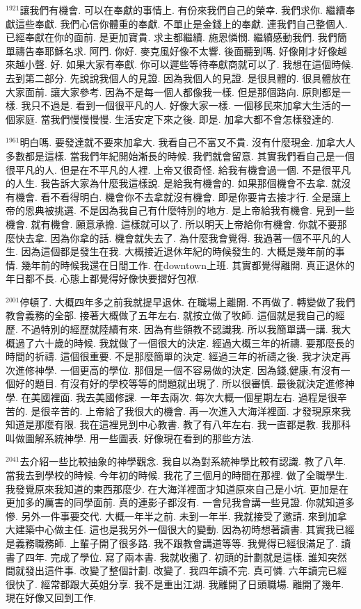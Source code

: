 \documentclass{book}
\begin{document}
$^{1921}$讓我們有機會.
可以在奉獻的事情上.
有份來我們自己的榮幸.
我們求你.
繼續奉獻這些奉獻.
我們心信你體重的奉獻.
不單止是金錢上的奉獻.
連我們自己整個人.
已經奉獻在你的面前.
是更加寶貴.
求主都繼續.
施恩憐憫.
繼續感動我們.
我們簡單禱告奉耶穌名求.
阿門.
你好.
麥克風好像不太響.
後面聽到嗎.
好像剛才好像越來越小聲.
好.
如果大家有奉獻.
你可以遲些等待奉獻商就可以了.
我想在這個時候.
去到第二部分.
先說說我個人的見證.
因為我個人的見證.
是很具體的.
很具體放在大家面前.
讓大家參考.
因為不是每一個人都像我一樣.
但是那個路向.
原則都是一樣.
我只不過是.
看到一個很平凡的人.
好像大家一樣.
一個移民來加拿大生活的一個家庭.
當我們慢慢慢慢.
生活安定下來之後.
即是.
加拿大都不會怎樣發達的.

$^{1961}$明白嗎.
要發達就不要來加拿大.
我看自己不富又不貴.
沒有什麼現金.
加拿大人多數都是這樣.
當我們年紀開始漸長的時候.
我們就會留意.
其實我們看自己是一個很平凡的人.
但是在不平凡的人裡.
上帝又很奇怪.
給我有機會過一個.
不是很平凡的人生.
我告訴大家為什麼我這樣說.
是給我有機會的.
如果那個機會不去拿.
就沒有機會.
看不看得明白.
機會你不去拿就沒有機會.
即是你要肯去接才行.
全是讓上帝的恩典被挑選.
不是因為我自己有什麼特別的地方.
是上帝給我有機會.
見到一些機會.
就有機會.
願意承擔.
這樣就可以了.
所以明天上帝給你有機會.
你就不要那麼快去拿.
因為你拿的話.
機會就失去了.
為什麼我會覺得.
我過著一個不平凡的人生.
因為這個都是發生在我.
大概接近退休年紀的時候發生的.
大概是幾年前的事情.
幾年前的時候我還在日間工作.
在downtown上班.
其實都覺得離開.
真正退休的年日都不長.
心態上都覺得好像快要摺好包袱.

$^{2001}$停頓了.
大概四年多之前我就提早退休.
在職場上離開.
不再做了.
轉變做了我們教會義務的全部.
接著大概做了五年左右.
就按立做了牧師.
這個就是我自己的經歷.
不過特別的經歷就陸續有來.
因為有些領教不認識我.
所以我簡單講一講.
我大概過了六十歲的時候.
我就做了一個很大的決定.
經過大概三年的祈禱.
要那麼長的時間的祈禱.
這個很重要.
不是那麼簡單的決定.
經過三年的祈禱之後.
我才決定再次進修神學.
一個更高的學位.
那個是一個不容易做的決定.
因為錢,健康,有沒有一個好的題目.
有沒有好的學校等等的問題就出現了.
所以很審慎.
最後就決定進修神學.
在美國裡面.
我去美國修課.
一年去兩次.
每次大概一個星期左右.
過程是很辛苦的.
是很辛苦的.
上帝給了我很大的機會.
再一次進入大海洋裡面.
才發現原來我知道是那麼有限.
我在這裡見到中心教書.
教了有八年左右.
我一直都是教.
我那科叫做圖解系統神學.
用一些圖表.
好像現在看到的那些方法.

$^{2041}$去介紹一些比較抽象的神學觀念.
我自以為對系統神學比較有認識.
教了八年.
當我去到學校的時候.
今年初的時候.
我花了三個月的時間在那裡.
做了全職學生.
我發覺原來我知道的東西那麼少.
在大海洋裡面才知道原來自己是小坑.
更加是在更加多的厲害的同學面前.
真的連影子都沒有.
一會兒我會講一些見證.
你就知道多慘.
另外一件事要交代.
大概一年半之前.
未到一年半.
我就接受了邀請.
來到加拿大建築中心做主任.
這也是我另外一個很大的變動.
因為初時想著讀書.
其實我已經是義務職務師.
上輩子開了很多路.
我不跟教會講道等等.
我覺得已經很滿足了.
讀書了四年.
完成了學位.
寫了兩本書.
我就收攤了.
初頭的計劃就是這樣.
誰知突然間就發出這件事.
改變了整個計劃.
改變了.
我四年讀不完.
真可憐.
六年讀完已經很快了.
經常都跟大英姐分享.
我不是重出江湖.
我離開了日頭職場.
離開了幾年.
現在好像又回到工作.
\end{document}
